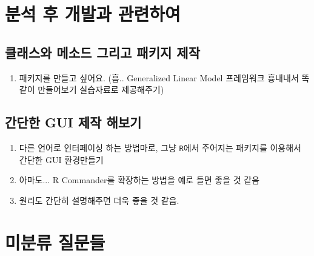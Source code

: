 \documentclass{report}
\begin{document}




%
%



\chapter{분석 후 개발과 관련하여}
\section{클래스와 메소드 그리고 패키지 제작}
\begin{enumerate}
\item 패키지를 만들고 싶어요. (흠.. Generalized Linear Model 프레임워크 흉내내서 똑같이 만들어보기 실습자료로 제공해주기)
\end{enumerate}



%
%


%
%
%

\section{간단한 GUI 제작 해보기}

\begin{enumerate}
	\item 다른 언어로 인터페이싱 하는 방법마로, 그냥 \texttt{R}에서 주어지는 패키지를 이용해서 간단한 GUI 환경만들기
	\item 아마도... R Commander를 확장하는 방법을 예로 들면 좋을 것 같음
	\item 원리도 간단히 설명해주면 더욱 좋을 것 같음. 
\end{enumerate}


%
%
%


\chapter{미분류 질문들}
\end{document}
